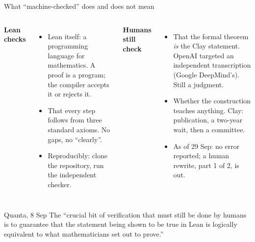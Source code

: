 \documentclass[aspectratio=169, 10pt]{beamer}
\newcommand{\q}[1]{``#1''}
\newcommand{\sq}[1]{``#1''}
\begin{document}
\begin{frame}{What \sq{machine-checked} does and does not mean}
  \begin{columns}[t]
    \textbf{Lean checks}
    \begin{itemize}
      \item Lean itself: a programming language for mathematics. A proof is a
        program; the compiler accepts it or rejects it.
      \item That every step follows from three standard axioms. No gaps, no
        \q{clearly}.
      \item Reproducibly: clone the repository, run the independent checker.
    \end{itemize}
    \textbf{Humans still check}
    \begin{itemize}
      \item That the formal theorem \emph{is} the Clay statement. OpenAI
        targeted an independent transcription (Google DeepMind's). Still a
        judgment.
      \item Whether the construction teaches anything. Clay: publication, a
        two-year wait, then a committee.
      \item As of 29 Sep: no error reported; a human rewrite, part 1 of 2, is
        out.
    \end{itemize}
  \end{columns}
  \vspace{2pt}
  \begin{block}{Quanta, 8 Sep}
    \small The \q{crucial bit of verification that must still be done by
    humans is to guarantee that the statement being shown to be true in Lean
    is logically equivalent to what mathematicians set out to prove.}
  \end{block}
\end{frame}
\end{document}
